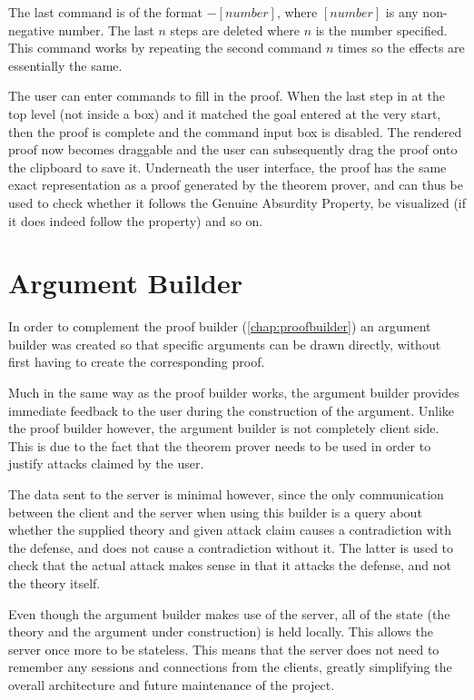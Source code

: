 \documentclass[11pt,twoside,a4paper]{report}
\begin{document}
The last command is of the format $-[number]$, where $[number]$ is any non-negative number. The last $n$ steps are deleted where $n$ is the number specified. This command works by repeating the second command $n$ times so the effects are essentially the same.

The user can enter commands to fill in the proof. When the last step in at the top level (not inside a box) and it matched the goal entered at the very start, then the proof is complete and the command input box is disabled. The rendered proof now becomes draggable and the user can subsequently drag the proof onto the clipboard to save it. Underneath the user interface, the proof has the same exact representation as a proof generated by the theorem prover, and can thus be used to check whether it follows the Genuine Absurdity Property, be visualized (if it does indeed follow the property) and so on.

\chapter{Argument Builder}
\label{chap:argbuilder}
In order to complement the proof builder (\autoref{chap:proofbuilder}) an argument builder was created so that specific arguments can be drawn directly, without first having to create the corresponding proof. 

Much in the same way as the proof builder works, the argument builder provides immediate feedback to the user during the construction of the argument. Unlike the proof builder however, the argument builder is not completely client side. This is due to the fact that the theorem prover needs to be used in order to justify attacks claimed by the user.

The data sent to the server is minimal however, since the only communication between the client and the server when using this builder is a query about whether the supplied theory and given attack claim causes a contradiction with the defense, and does not cause a contradiction without it. The latter is used to check that the actual attack makes sense in that it attacks the defense, and not the theory itself.

Even though the argument builder makes use of the server, all of the state (the theory and the argument under construction) is held locally. This allows the server once more to be stateless. This means that the server does not need to remember any sessions and connections from the clients, greatly simplifying the overall architecture and future maintenance of the project.
\end{document}
